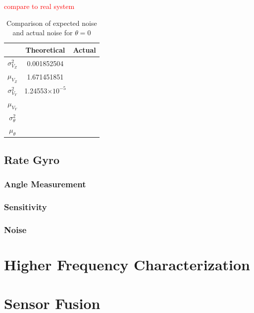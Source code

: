 \documentclass{article}
\newcommand{\xxx}[1]{\textcolor{red}{#1}}
\theoremstyle{plain}
\theoremstyle{definition}
\theoremstyle{remark}
\providecommand{\e}[1]{\ensuremath{\times 10^{#1}}}
\begin{document}
\xxx{compare to real system}


\begin{table}
\begin{center}
    \begin{tabular}{|c|c|c|}
        \hline
        ~                   & Theoretical  & Actual \\ \hline
        $\sigma^2_{V_{Z}}$    & 0.001852504            & ~      \\ 
	$\mu_{V_{Z}}$       & 1.671451851            & ~      \\ 
	$\sigma^2_{V_{Y}}$ & 1.24553\e{-5}		& ~ \\
	$\mu_{V_{Y}}$       & ~            & ~      \\ 
        $\sigma^2_{\theta}$ & ~            & ~      \\ 
        $\mu_{\theta}$      & ~            & ~      \\
        \hline
    \end{tabular}
\label{Noise_dual_T}
\caption{Comparison of expected noise and actual noise for $\theta = 0$}
\end{center}
\end{table}


\subsection{Rate Gyro}

\subsubsection{Angle Measurement}

\subsubsection{Sensitivity}

\subsubsection{Noise}

\clearpage
\section{Higher Frequency Characterization}

\clearpage
\section{Sensor Fusion}

\clearpage
\end{document}
